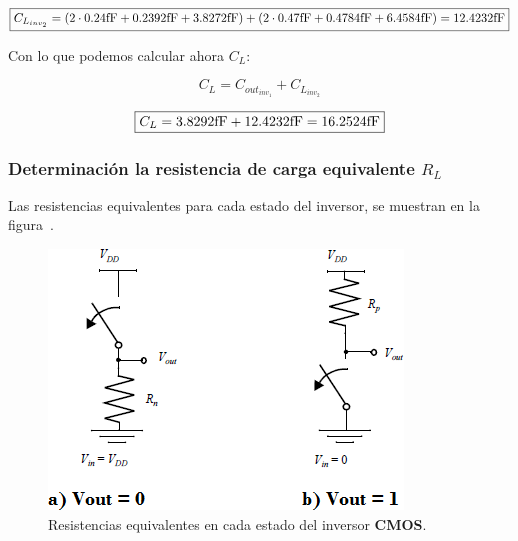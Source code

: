 \begin{equation*}
\boxed{ C_{L_{inv_{2}}} =  \left( 2 \cdot 0.24 \si[per-mode=symbol]{\femto\farad} + 0.2392 \si[per-mode=symbol]{\femto\farad} + 3.8272 \si[per-mode=symbol]{\femto\farad} \right) + \left( 2 \cdot 0.47 \si[per-mode=symbol]{\femto\farad} + 0.4784 \si[per-mode=symbol]{\femto\farad} + 6.4584 \si[per-mode=symbol]{\femto\farad} \right) = 12.4232 \si[per-mode=symbol]{\femto\farad} }
\end{equation*}



Con lo que podemos calcular ahora $C_{L}$:


\begin{equation*}
C_{L} = C_{out_{inv_{1}}} + C_{L_{inv_{2}}}
\end{equation*}


\begin{equation*}
\boxed{  C_{L} = 3.8292 \si[per-mode=symbol]{\femto\farad} + 12.4232 \si[per-mode=symbol]{\femto\farad} = 16.2524 \si[per-mode=symbol]{\femto\farad} }
\end{equation*}





\subsubsection{Determinación la resistencia de carga equivalente $R_{L}$}


Las resistencias equivalentes para cada estado del inversor, se muestran en la figura~.




\begin{figure}[H] %
\begin{center}
\includegraphics[width=0.7 \textwidth, angle=0]{./img/point1/resistance_equivalent}
\caption{\label{fig:fig_inverter_equivalent_resistances}\footnotesize{Resistencias equivalentes en cada estado del inversor \textbf{CMOS}.}}
\end{center}
\end{figure}



